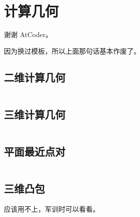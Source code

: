 \section{计算几何}

谢谢 AtCoder。

因为换过模板，所以上面那句话基本作废了。

\subsection{二维计算几何}

\inputminted{cpp}{icpc/geom/geom2d/geom2d.cpp}

\subsection{三维计算几何}

\inputminted{cpp}{icpc/geom/geom3d/geom3d.cpp}

\subsection{平面最近点对}

\inputminted{cpp}{icpc/geom/close/close.cpp}

\subsection{三维凸包}

应该用不上，军训时可以看看。

\inputminted{cpp}{icpc/geom/swtb/swtb.cpp}